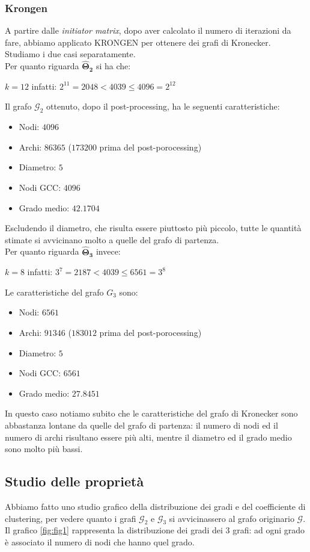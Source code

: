 \documentclass[12pt]{scrartcl}
\begin{document}
\subsubsection{Krongen}
A partire dalle \textit{initiator matrix}, dopo aver calcolato il numero di iterazioni da fare, abbiamo applicato \textsf{KRONGEN} per ottenere dei grafi di Kronecker.  Studiamo i due casi separatamente. \\
Per quanto riguarda $\mathbf{\hat{\Theta}_2}$ si ha che:
\begin{center}
	$k = 12$ infatti: $2^{11} = 2048 < 4039 \leq 4096 = 2^{12}$
\end{center}
Il grafo $\mathcal{G}_2$ ottenuto, dopo il post-processing, ha le seguenti caratteristiche:
\begin{itemize}
	\item Nodi: $4096$ 
	\item Archi: $86365$ ($173200$ prima del post-porocessing)
	\item Diametro: $5$
	\item Nodi GCC: $4096$
	\item Grado medio: $42.1704$
\end{itemize}
Escludendo il diametro, che risulta essere piuttosto più piccolo, tutte le quantità stimate si avvicinano molto a quelle del grafo di partenza.\\
Per quanto riguarda $\mathbf{\hat{\Theta}_3}$ invece:
\begin{center}
	$k = 8$ infatti: $3^7 = 2187< 4039 \leq 6561 = 3^8$
\end{center}
Le caratteristiche del grafo $G_3$ sono:
\begin{itemize}
	\item Nodi: $6561$ 
	\item Archi: $91346$ ($183012$ prima del post-porocessing)
	\item Diametro: $5$
	\item Nodi GCC: $6561$
	\item Grado medio: $27.8451$
\end{itemize}
In questo caso notiamo subito che le caratteristiche del grafo di Kronecker sono abbastanza lontane da quelle del grafo di partenza: il numero di nodi ed il numero di archi risultano essere più alti, mentre il diametro ed il grado medio sono molto più bassi.
\subsection{Studio delle proprietà}
Abbiamo fatto uno studio grafico della distribuzione dei gradi e del coefficiente di clustering, per vedere quanto i grafi $\mathcal{G}_2$ e $\mathcal{G}_3$ si avvicinassero al grafo originario $\mathcal{G}$. Il grafico \ref{fig:fig1} rappresenta la distribuzione dei gradi dei 3 grafi: ad ogni grado è associato il numero di nodi che hanno quel grado.
\end{document}
